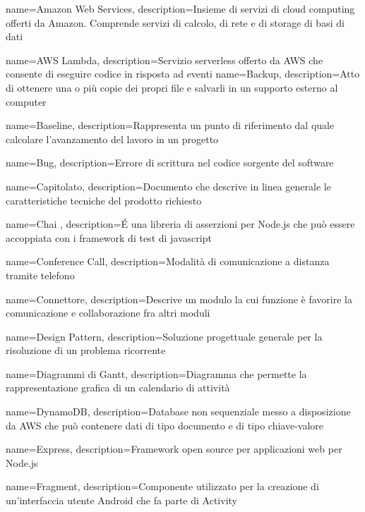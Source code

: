 {
	name={Amazon Web Services},
	description={Insieme di servizi di cloud computing offerti da Amazon. Comprende servizi di calcolo, di rete e di storage di basi di dati}
}

{
	name={AWS Lambda},
	description={Servizio serverless offerto da AWS che consente di eseguire codice in risposta ad eventi}
	{\newpage}
}
{
	name={Backup},
	description={Atto di ottenere una o più copie dei propri file e salvarli in un supporto esterno al computer}
}

{
	name={Baseline},
	description={Rappresenta un punto di riferimento dal quale calcolare l’avanzamento del lavoro in un progetto}
}

{
	name={Bug},
	description={Errore di scrittura nel codice sorgente del software}
	{\newpage}
}

{
	name={Capitolato},
	description={Documento che descrive in linea generale le caratteristiche tecniche del prodotto richiesto}
}

{
	name={Chai },
	description={É una libreria di asserzioni per Node.js che può essere accoppiata con i framework di test di javascript}
}

{
	name={Conference Call},
	description={Modalità di comunicazione a distanza tramite telefono}
}

{
	name={Connettore},
	description={Descrive un modulo la cui funzione è favorire la comunicazione e collaborazione fra altri moduli}
	{\newpage}
}

{
	name={Design Pattern},
	description={Soluzione progettuale generale per la risoluzione di un problema ricorrente}
}

{
	name={Diagrammi di Gantt},
	description={Diagramma che permette la rappresentazione grafica di un calendario di attività}
}

{
	name={DynamoDB},
	description={Database non sequenziale messo a disposizione da AWS che può contenere dati di tipo documento e di tipo chiave-valore}
	{\newpage}
}

{
	name={Express},
	description={Framework open source per applicazioni web per Node.js}
	{\newpage}
}

{
	name={Fragment},
	description={Componente utilizzato per la creazione di un'interfaccia utente Android che fa parte di Activity}
}

